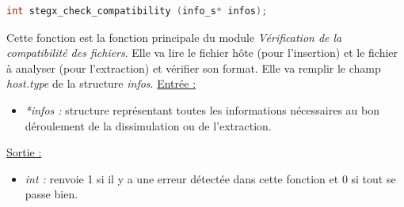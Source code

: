 \documentclass[11pt]{article}
\begin{document}
\begin{lstlisting}[language=c]
int stegx_check_compatibility (info_s* infos);
\end{lstlisting}

Cette fonction est la fonction principale du module 
\textit{Vérification de la compatibilité des fichiers}. 
Elle va lire le fichier hôte (pour l'insertion) et le fichier 
à analyser (pour l'extraction) et vérifier son format. 
Elle va remplir le champ \textit{host.type} de la structure \textit{infos}.  
\newline
\underline{Entrée :}
\begin{itemize}
\item \textit{*infos :} structure représentant toutes les informations 
nécessaires au bon déroulement de la dissimulation ou de l'extraction. 
\end{itemize}
\underline{Sortie :}
\begin{itemize}
\item \textit{int :} renvoie 1 si il y a une erreur détectée dans cette 
fonction et 0 si tout se passe bien.
\newline 
\end{itemize}



\end{document}
